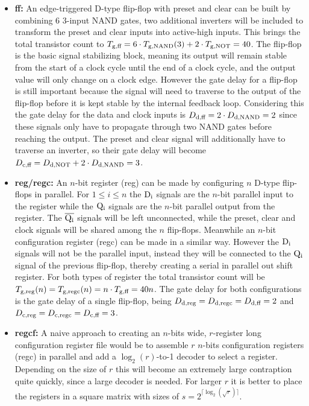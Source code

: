 \documentclass[a4paper, 9pt, conference, onecolumn]{ieeeconf}
\newcommand{\bfit}[1]{\item{\bf #1:}}
\newcommand{\ifnn}[1]{\if\relax\detokenize{#1}\relax\else}
\newcommand{\f}[3]{#1_{\text{\ifnn{#2}#2,\fi#3}}}
\newcommand{\signal}[1]{\texttt{$\text{#1}$}}
\newcommand{\signali}[1]{\texttt{$\overline{\text{#1}}$}}
\begin{document}
\begin{itemize}
  \bfit{ff}
    An edge-triggered D-type flip-flop with preset and clear can be built by combining $6$ $3$-input NAND gates\cite{74x74}, two additional inverters will be included to transform the preset and clear inputs into active-high inputs. This brings the total transistor count to $\f{T}{g}{ff} = 6 \cdot \f{T}{g}{NAND}(3) + 2 \cdot \f{T}{g}{NOT} = 40$. The flip-flop is the basic signal stabilizing block, meaning its output will remain stable from the start of a clock cycle until the end of a clock cycle, and the output value will only change on a clock edge. However the gate delay for a flip-flop is still important because the signal will need to traverse to the output of the flip-flop before it is kept stable by the internal feedback loop. Considering this the gate delay for the data and clock inputs is $\f{D}{d}{ff} = 2 \cdot \f{D}{d}{NAND} = 2$ since these signals only have to propagate through two NAND gates before reaching the output. The preset and clear signal will additionally have to traverse an inverter, so their gate delay will become $\f{D}{c}{ff} = \f{D}{d}{NOT} + 2 \cdot \f{D}{d}{NAND} = 3$.
  \bfit{reg/regc}
    An $n$-bit register (reg) can be made by configuring $n$ D-type flip-flops in parallel. For $1 \leq i \leq n$ the \signal{D\textsubscript{i}} signals are the $n$-bit parallel input to the register while the \signal{Q\textsubscript{i}} signals are the $n$-bit parallel output from the register. The \signali{Q\textsubscript{i}} signals will be left unconnected, while the preset, clear and clock signals will be shared among the $n$ flip-flops. Meanwhile an $n$-bit configuration register (regc) can be made in a similar way. However the \signal{D\textsubscript{i}} signals will not be the parallel input, instead they will be connected to the \signal{Q\textsubscript{i}} signal of the previous flip-flop, thereby creating a serial in parallel out shift register\cite{74x165}. For both types of register the total transistor count will be $\f{T}{g}{reg}(n) = \f{T}{g}{regc}(n) = n \cdot \f{T}{g}{ff} = 40n$. The gate delay for both configurations is the gate delay of a single flip-flop, being $\f{D}{d}{reg} = \f{D}{d}{regc} = \f{D}{d}{ff} = 2$ and $\f{D}{c}{reg} = \f{D}{c}{regc} = \f{D}{c}{ff} = 3$.
  \bfit{regcf}
    A naive approach to creating an $n$-bits wide, $r$-register long configuration register file would be to assemble $r$ $n$-bits configuration registers (regc) in parallel and add a $\log_{2}(r)$-to-1 decoder to select a register. Depending on the size of $r$ this will become an extremely large contraption quite quickly, since a large decoder is needed. For larger $r$ it is better to place the registers in a square matrix with sizes of $s = 2^{\lceil\log_{2}(\sqrt{r})\rceil}$. 
    

\end{itemize}
\end{document}
